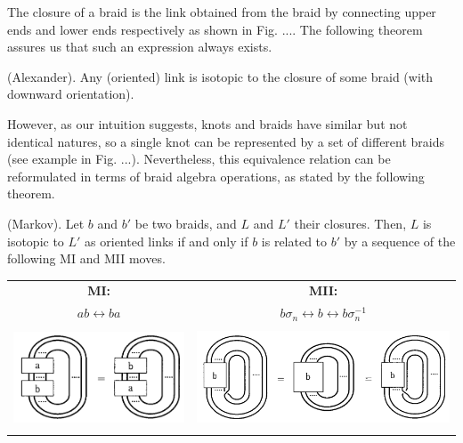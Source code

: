 \documentclass[12pt,a4paper]{article}
\begin{document}
The closure of a braid is the link obtained from the braid by connecting upper
ends and lower ends respectively as shown in Fig. .... The following theorem
assures us that such an expression always exists.
\begin{tcolorbox}
\begin{theorem}\label{thm:Alexander}
   (Alexander). Any (oriented) link is isotopic to the closure of some
braid (with downward orientation).  
\end{theorem}
\end{tcolorbox} 

However, as our intuition suggests, knots and braids have similar but not identical natures, so a single knot can be represented by a set of different braids (see example in Fig. ...). Nevertheless, this equivalence relation can be reformulated in terms of braid algebra operations, as stated by the following theorem.
\begin{tcolorbox}
\begin{theorem}\label{thm:Alexander}
   (Markov).  Let $b$ and $b'$ be two braids, and $L$ and $L'$ their closures.
Then, $L$ is isotopic to $L'$ as oriented links if and only if $b$ is related to $b'$ by a
sequence of the following MI and MII moves.

\begin{center}
\begin{tabular}{c c}
\textbf{MI:} & \textbf{MII:} \\
$ab \longleftrightarrow ba$ & $b \sigma_n \longleftrightarrow b \longleftrightarrow b \sigma_n^{-1}$ \\[2mm]  
\includegraphics[height=3cm]{../img/MI.png} &
\includegraphics[height=3cm]{../img/MII.png}
\end{tabular}
\end{center}

\end{theorem}
\end{tcolorbox} 
\end{document}
